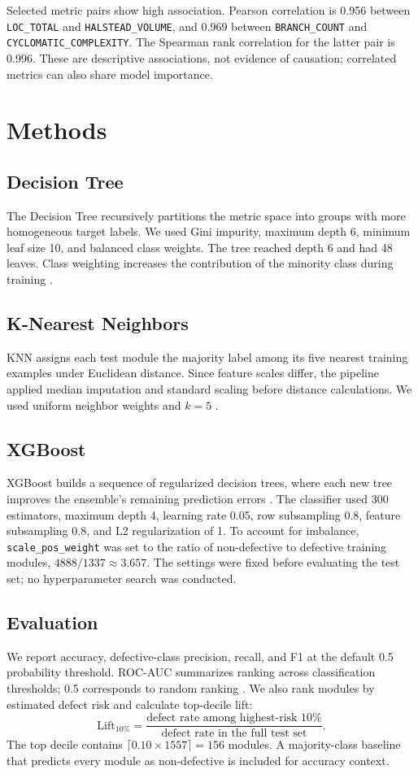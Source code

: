 \documentclass[conference]{IEEEtran}
\begin{document}
Selected metric pairs show high association. Pearson correlation is 0.956 between \texttt{LOC\_TOTAL} and \texttt{HALSTEAD\_VOLUME}, and 0.969 between \texttt{BRANCH\_COUNT} and \texttt{CYCLOMATIC\_COMPLEXITY}. The Spearman rank correlation for the latter pair is 0.996. These are descriptive associations, not evidence of causation; correlated metrics can also share model importance.

\section{Methods}
\subsection{Decision Tree}
The Decision Tree recursively partitions the metric space into groups with more homogeneous target labels. We used Gini impurity, maximum depth 6, minimum leaf size 10, and balanced class weights. The tree reached depth 6 and had 48 leaves. Class weighting increases the contribution of the minority class during training \cite{sklearn_tree}.

\subsection{K-Nearest Neighbors}
KNN assigns each test module the majority label among its five nearest training examples under Euclidean distance. Since feature scales differ, the pipeline applied median imputation and standard scaling before distance calculations. We used uniform neighbor weights and $k=5$ \cite{sklearn_knn}.

\subsection{XGBoost}
XGBoost builds a sequence of regularized decision trees, where each new tree improves the ensemble's remaining prediction errors \cite{xgboost}. The classifier used 300 estimators, maximum depth 4, learning rate 0.05, row subsampling 0.8, feature subsampling 0.8, and L2 regularization of 1. To account for imbalance, \texttt{scale\_pos\_weight} was set to the ratio of non-defective to defective training modules, $4888/1337 \approx 3.657$. The settings were fixed before evaluating the test set; no hyperparameter search was conducted.

\subsection{Evaluation}
We report accuracy, defective-class precision, recall, and F1 at the default 0.5 probability threshold. ROC-AUC summarizes ranking across classification thresholds; 0.5 corresponds to random ranking \cite{fawcett}. We also rank modules by estimated defect risk and calculate top-decile lift:
\[
\mathrm{Lift}_{10\%} =
\frac{\text{defect rate among highest-risk 10\%}}
{\text{defect rate in the full test set}}.
\]
The top decile contains $\lceil 0.10 \times 1557 \rceil=156$ modules. A majority-class baseline that predicts every module as non-defective is included for accuracy context.
\end{document}
